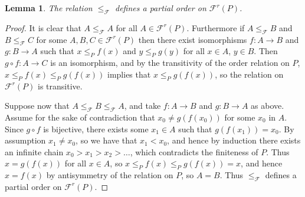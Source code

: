\documentclass{amsart}
\newtheorem{lem}[thm]{Lemma}
\theoremstyle{remark}
\newtheorem{defn}[thm]{Definition}
\begin{document}





\begin{lem}
\label{lem:f_partial_order}
The relation $\le_{\mathcal{F}}$ defines a partial order on $\mathcal{F}^r(P)$.
\end{lem}

\begin{proof}
It is clear that $A\le_\mathcal{F} A$ for all $A\in\mathcal{F}^r(P)$.  Furthermore if $A\le_\mathcal{F} B$ and $B\le_\mathcal{F} C$ for some $A,B,C\in \mathcal{F}^r(P)$ then there exist isomorphisms $f\colon A\rightarrow B$ and $g\colon B\rightarrow A$ such that $x\le_P f(x)$ and $y\le_P g(y)$ for all $x\in A$, $y\in B$.  Then $g\circ f\colon A\rightarrow C$ is an isomorphism, and by the transitivity of the order relation on $P$, $x\le_P f(x)\le_P g(f(x))$ implies that $x\le_P g(f(x))$, so the relation on $\mathcal{F}^r(P)$ is transitive.

Suppose now that $A\le_\mathcal{F} B\le_\mathcal{F} A$, and take $f\colon A\rightarrow B$ and $g\colon B\rightarrow A$ as above.  Assume for the sake of contradiction that $x_0 \ne g(f(x_0))$ for some $x_0$ in $A$.  Since $g\circ f$ is bijective, there exists some $x_1\in A$ such that $g(f(x_1)) = x_0$.  By assumption $x_1\ne x_0$, so we have that $x_1 < x_0$, and hence by induction there exists an infinite chain $x_0 > x_1 > x_2 > \ldots$, which contradicts the finiteness of $P$.  Thus $x = g(f(x))$ for all $x\in A$, so $x\le_P f(x)\le_P g(f(x)) = x$, and hence $x = f(x)$ by antisymmetry of the relation on $P$, so $A = B$.  Thus $\le_\mathcal{F}$ defines a partial order on $\mathcal{F}^r(P)$.
\end{proof}
\end{document}
